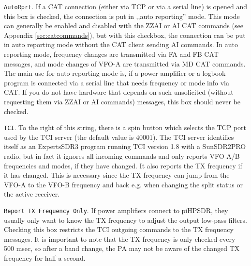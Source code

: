 \documentclass[12pt]{book}
\def\rett#1{\texttt{\color{red}#1}}
\def\pH{pi\-HPSDR\xspace}
\begin{document}
\rett{AutoRprt}. If a CAT connection (either via TCP or via a serial line) is opened and this box is checked,
the connection is put in ,,auto reporting'' mode. This mode can generally be enabled and disabled with the
ZZAI or AI CAT commands (see Appendix \ref{sec:catcommands}), but with this checkbox, the connection can be put
in auto reporting mode without the CAT client sending AI commands. In auto reporting mode, frequency changes
are transmitted via FA and FB CAT messages, and mode changes of VFO-A are transmitted via MD CAT commands.
The main use for auto reporting mode is, if a power amplifier or a logbook program
is connected via a serial line that needs frequency or mode  info via CAT. If you do not have hardware that depends
on such unsolicited (without requesting them via ZZAI or AI commands) messages, this box should never be checked.

\rett{TCI}. To the right of this string, there is a spin button which selects the TCP port used by the
TCI  server (the default value is 40001). The TCI server identifies itself as an ExpertsSDR3 program
running TCI version 1.8 with a SunSDR2PRO radio, but in fact it ignores all incoming commands and only
reports VFO-A/B frequencies and modes, if they have changed. It also reports the TX frequency if it has changed.
This is necessary since the TX frequency can jump from the VFO-A to the VFO-B frequency and back e.g. when
changing the split status or the active receiver.

\rett{Report TX  Frequency Only}. If power amplifiers connect to \pH, they usually only want to know the
TX frequency to adjust the output low-pass filters. Checking this box restricts the TCI outgoing commands
to the TX  frequency messages. It is important  to note that the TX frequency is only  checked every
500 msec, so after a band change, the PA may  not be aware of  the changed TX frequency for half  a second.


\end{document}
